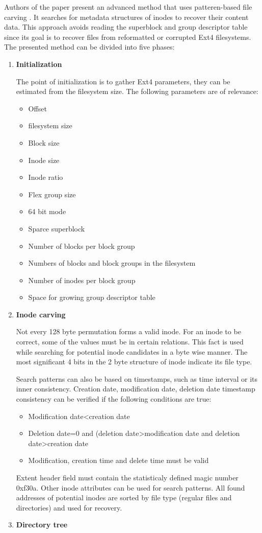 \documentclass{acm_proc_article-sp}
\begin{document}
Authors of the paper present an advanced method that uses patteren-based file carving . It searches for metadata structures of inodes to recover their content data. This approach avoids reading the superblock and group descriptor table since its goal is to recover files from reformatted or corrupted Ext4 filesystems. The presented method can be divided into five phases\cite{dewald2017afeic}:
\begin{enumerate}
\item \textbf{Initialization}

The point of initialization  is to gather Ext4 parameters, they can be estimated from the filesystem size. The following parameters are of relevance:
\begin{itemize} 
\item Offset
\item filesystem size
\item Block size
\item Inode size
\item Inode ratio
\item Flex group size
\item 64 bit mode
\item Sparce superblock
\item Number of blocks per block group
\item Numbers of blocks and block groups in the filesystem
\item Number of inodes per block group
\item Space for growing group descriptor table
\end{itemize}
\item \textbf{Inode carving}

Not every 128 byte permutation forms a valid inode. For an inode to be correct, some of the values must be in certain relations. This fact is used while searching for potential inode candidates in a byte wise manner. The most significant 4 bits in the 2 byte structure of inode indicate its file type.

Search patterns can also be based on timestamps, such as time interval or its inner consistency. Creation date, modification date, deletion date timestamp consistency can be verified if the following conditions are true:
\begin{itemize}
\item Modification date\textless creation date
\item Deletion date=0 and (deletion date\textgreater modification date and deletion date\textgreater creation date
\item Modification, creation time and delete time must be valid
\end{itemize}
Extent header field must contain the statisticaly defined magic number 0xf30a. Other inode attributes can be used for search patterns. All found addresses of potential inodes are sorted by file type (regular files and directories) and used for recovery.
\item \textbf{Directory tree}


\end{enumerate}
\end{document}
